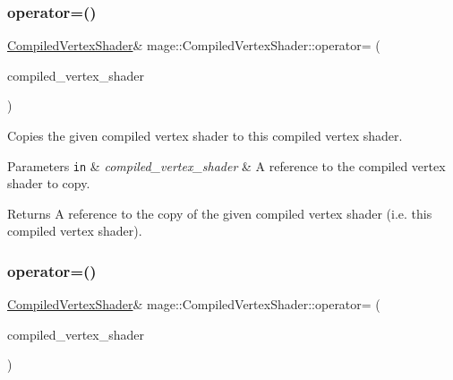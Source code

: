 \subsubsection{\texorpdfstring{operator=()}{operator=()}\hspace{0.1cm}{\footnotesize\ttfamily [1/2]}}
{\footnotesize\ttfamily \hyperlink{structmage_1_1_compiled_vertex_shader}{Compiled\+Vertex\+Shader}\& mage\+::\+Compiled\+Vertex\+Shader\+::operator= (\begin{DoxyParamCaption}\item[{const \hyperlink{structmage_1_1_compiled_vertex_shader}{Compiled\+Vertex\+Shader} \&}]{compiled\+\_\+vertex\+\_\+shader }\end{DoxyParamCaption})\hspace{0.3cm}{\ttfamily [delete]}}

Copies the given compiled vertex shader to this compiled vertex shader.


\begin{DoxyParams}[1]{Parameters}
\mbox{\tt in}  & {\em compiled\+\_\+vertex\+\_\+shader} & A reference to the compiled vertex shader to copy. \\
\hline
\end{DoxyParams}
\begin{DoxyReturn}{Returns}
A reference to the copy of the given compiled vertex shader (i.\+e. this compiled vertex shader). 
\end{DoxyReturn}
\hypertarget{structmage_1_1_compiled_vertex_shader_ae42ff3528b8a4b58c3d9f085d0d4573e}{}\label{structmage_1_1_compiled_vertex_shader_ae42ff3528b8a4b58c3d9f085d0d4573e} 
\subsubsection{\texorpdfstring{operator=()}{operator=()}\hspace{0.1cm}{\footnotesize\ttfamily [2/2]}}
{\footnotesize\ttfamily \hyperlink{structmage_1_1_compiled_vertex_shader}{Compiled\+Vertex\+Shader}\& mage\+::\+Compiled\+Vertex\+Shader\+::operator= (\begin{DoxyParamCaption}\item[{\hyperlink{structmage_1_1_compiled_vertex_shader}{Compiled\+Vertex\+Shader} \&\&}]{compiled\+\_\+vertex\+\_\+shader }\end{DoxyParamCaption})\hspace{0.3cm}{\ttfamily [delete]}}

